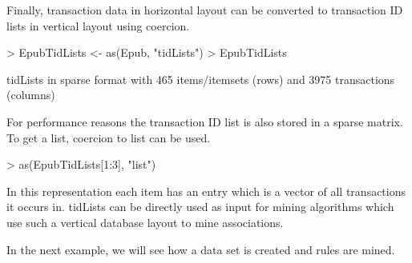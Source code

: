 \documentclass[10pt,a4paper]{article}
\newcommand{\class}[1]{\mbox{\textsf{#1}}}
\begin{document}
Finally, transaction data in horizontal layout can be converted to
transaction ID lists in vertical layout using coercion.

\begin{Schunk}
\begin{Sinput}
> EpubTidLists <- as(Epub, "tidLists")
> EpubTidLists
\end{Sinput}
\begin{Soutput}
tidLists in sparse format with
 465 items/itemsets (rows) and
 3975 transactions (columns)
\end{Soutput}
\end{Schunk}

For performance reasons the transaction ID list
is also stored in a sparse matrix. To get a list, coercion to \class{list}
can be used.

\begin{Schunk}
\begin{Sinput}
> as(EpubTidLists[1:3], "list")
\end{Sinput}
\end{Schunk}

In this representation each item has an entry
which is a vector of all transactions it occurs in.
\class{tidLists} can be directly used as input for mining algorithms which 
use such a vertical database layout to mine associations.

In the next example, we will see how a data set is created and
rules are mined.
\end{document}
